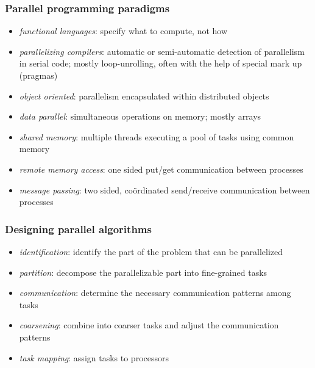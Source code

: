 \begin{frame}[fragile]
%
  \frametitle{Parallel programming paradigms}
%
  \begin{itemize}
%
  \item {\em functional languages}: specify what to compute, not how
  \item {\em parallelizing compilers}: automatic or semi-automatic detection of parallelism in
    serial code; mostly loop-unrolling, often with the help of special mark up (pragmas)
  \item {\em object oriented}: parallelism encapsulated within distributed objects

  \item {\em data parallel}: simultaneous operations on memory; mostly arrays
  \item {\em shared memory}: multiple threads executing a pool of tasks using common memory
  \item {\em remote memory access}: one sided put/get communication between processes
  \item {\em message passing}: two sided, co\"ordinated send/receive communication between
    processes
%
  \end{itemize}
%
\end{frame}

\begin{frame}[fragile]
%
  \frametitle{Designing parallel algorithms}
%
  \begin{itemize}
%
  \item {\em identification}: identify the part of the problem that can be parallelized
  \item {\em partition}: decompose the parallelizable part into fine-grained tasks
  \item {\em communication}: determine the necessary communication patterns among tasks
  \item {\em coarsening}: combine into coarser tasks and adjust the communication patterns
  \item {\em task mapping}: assign tasks to processors
%
  \end{itemize}
%
\end{frame}

